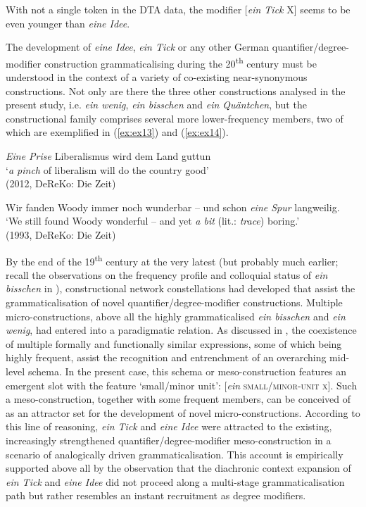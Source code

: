 \documentclass[output=paper]{langsci/langscibook}
\begin{document}
With not a single token in the DTA data, the modifier [\textit{ein Tick} X] seems to be even younger than \textit{eine Idee}. 

The development of \textit{eine Idee}, \textit{ein Tick} or any other German quantifier\slash degree\hyp{}modifier construction grammaticalising during the 20\textsuperscript{th} century must be understood in the context of a variety of co-existing near-synonymous constructions. Not only are there the three other constructions analysed in the present study, i.e. \textit{ein wenig}, \textit{ein bisschen} and \textit{ein Quäntchen}, but the constructional family comprises several more lower-frequency members, two of which are exemplified in (\ref{ex:ex13}) and (\ref{ex:ex14}). 

\begin{exe}
	\ex \label{ex:ex13} \textit{Eine Prise} Liberalismus wird dem Land guttun \\
	‘\textit{a pinch} of liberalism will do the country good’ \\ (2012, DeReKo: Die Zeit) 
	
	\ex \label{ex:ex14} Wir fanden Woody immer noch wunderbar -- und schon \textit{eine Spur} langweilig.\\
	‘We still found Woody wonderful -- and yet \textit{a bit} (lit.: \textit{trace}) boring.’ \\ (1993, DeReKo: Die Zeit)
\end{exe}

By the end of the 19\textsuperscript{th} century at the very latest (but probably much earlier; recall the observations on the frequency profile and colloquial status of \textit{ein bisschen} in ), constructional network constellations had developed that assist the grammaticalisation of novel quantifier\slash degree\hyp{}modifier constructions. Multiple micro\hyp{}constructions, above all the highly grammaticalised \textit{ein bisschen} and \textit{ein wenig}, had entered into a paradigmatic relation. As discussed in , the coexistence of multiple formally and functionally similar expressions, some of which being highly frequent, assist the recognition and entrenchment of an overarching mid-level schema. In the present case, this schema or meso-construction features an emergent slot with the feature ‘small\slash minor unit’: [\textit{ein} \textsc{small/minor-unit x}]. Such a meso-construction, together with some frequent members, can be conceived of as an attractor set for the development of novel micro\hyp{}constructions. According to this line of reasoning, \textit{ein Tick} and \textit{eine Idee} were attracted to the existing, increasingly strengthened quantifier\slash degree\hyp{}modifier meso-construction in a scenario of analogically driven grammaticalisation. This account is empirically supported above all by the observation that the diachronic context expansion of \textit{ein Tick} and \textit{eine Idee} did not proceed along a multi-stage grammaticalisation path but rather resembles an instant recruitment as degree modifiers. 
\end{document}
